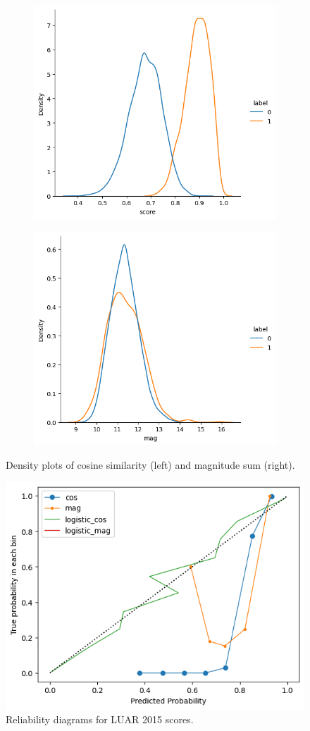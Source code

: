 \begin{figure}[h]
    \centering
    \begin{subfigure}{0.48\linewidth}
    \centering
    \includegraphics[width=\linewidth]{stylometryExtensions/figures/calibration_expts/cos_dist_2015.png}
    \end{subfigure} %
    \begin{subfigure}{0.48\linewidth}
    \centering
    \includegraphics[width=0.5\linewidth]{stylometryExtensions/figures/calibration_expts/mag_dist_2015.png}
    \end{subfigure} %
    \caption{Density plots of cosine similarity (left) and magnitude sum (right).}
    \label{fig:calibration:density}
\end{figure}

\begin{figure}[h]
    \centering
    \includegraphics[width=0.5\linewidth]{stylometryExtensions/figures/calibration_expts/calibrate_2015.png}
    \caption{Reliability diagrams for LUAR 2015 scores.}
    \label{fig:calibration:relaibility_2015}
\end{figure}

